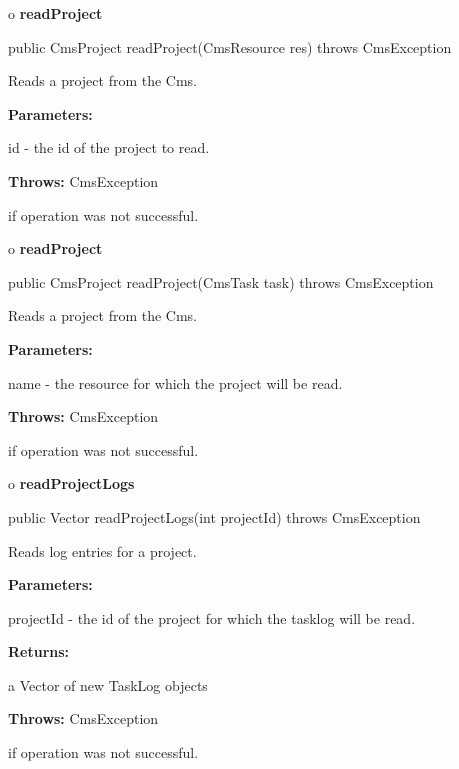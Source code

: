o {\bf readProject} 

\begin{PRE}
 public CmsProject readProject(CmsResource res) throws CmsException
\end{PRE}

\begin{description}
\htmlDD Reads a project from the Cms. 

\begin{description}
\item {\bf Parameters:}  

id - the id of the project to read.  
\item {\bf Throws:} CmsException  

if operation was not successful.  
\end{description}

\end{description}

o {\bf readProject} 

\begin{PRE}
 public CmsProject readProject(CmsTask task) throws CmsException
\end{PRE}

\begin{description}
\htmlDD Reads a project from the Cms. 

\begin{description}
\item {\bf Parameters:}  

name - the resource for which the project will be read.  
\item {\bf Throws:} CmsException  

if operation was not successful.  
\end{description}

\end{description}

o {\bf readProjectLogs} 

\begin{PRE}
 public Vector readProjectLogs(int projectId) throws CmsException
\end{PRE}

\begin{description}
\htmlDD Reads log entries for a project. 

\begin{description}
\item {\bf Parameters:}  

projectId - the id of the project for which the tasklog will be read.  
\item {\bf Returns:}  

a Vector of new TaskLog objects  
\item {\bf Throws:} CmsException  

if operation was not successful.  
\end{description}

\end{description}

